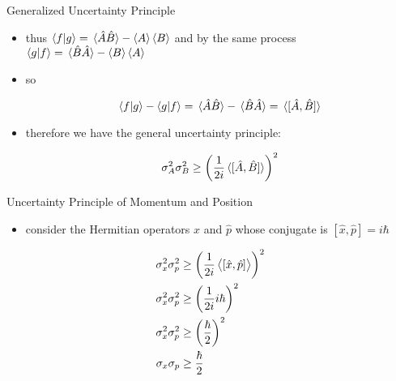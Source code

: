 \documentclass[ignorenonframetext,]{beamer}
\begin{document}
\begin{frame}{Generalized Uncertainty Principle}

\begin{itemize}
\item
  thus \(\braket{f}{g}=\expval*{\hat{A}\hat{B}}-\expval{A}\expval{B}\)
  and by the same process
  \(\braket{g}{f}=\expval*{\hat{B}\hat{A}}-\expval{B}\expval{A}\)
\item
  so

  \begin{displaymath}
  \braket{f}{g}-\braket{g}{f}=\expval*{\hat{A}\hat{B}}-\expval*{\hat{B}\hat{A}}=\expval*{[\hat{A},\hat{B}]}
  \end{displaymath}
\item
  therefore we have the general uncertainty principle:

  \begin{displaymath}
  \sigma_A^2\sigma_B^2\ge\left(\frac{1}{2i}\expval*{[\hat{A},\hat{B}]}\right)^2
  \end{displaymath}
\end{itemize}

\end{frame}

\begin{frame}{Uncertainty Principle of Momentum and Position}

\begin{itemize}
\itemsep1pt\parskip0pt
\item
  consider the Hermitian operators \(\hat{x}\) and \(\hat{p}\) whose
  conjugate is \([\hat{x},\hat{p}]=i\hbar\)
\end{itemize}

\begin{align*}
\sigma_x^2\sigma_p^2 &\ge \left(\frac{1}{2i}\expval{[\hat{x},\hat{p}]}\right)^2
\\
\sigma_x^2\sigma_p^2 &\ge \left(\frac{1}{2i}i\hbar\right)^2
\\
\sigma_x^2\sigma_p^2 &\ge \left(\frac{\hbar}{2}\right)^2
\\
\sigma_x\sigma_p &\ge \frac{\hbar}{2}
\end{align*}

\end{frame}
\end{document}
